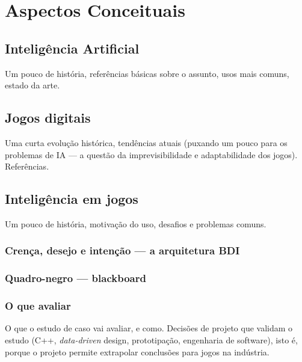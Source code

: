 \chapter{Aspectos Conceituais}

\section{Inteligência Artificial}

Um pouco de história, referências básicas sobre o assunto, usos mais
comuns, estado da arte.

\section{Jogos digitais}

Uma curta evolução histórica, tendências atuais (puxando um pouco para
os problemas de IA --- a questão da imprevisibilidade e adaptabilidade
dos jogos). Referências.

\section{Inteligência em jogos}

Um pouco de história, motivação do uso, desafios e problemas comuns.

\subsection{Crença, desejo e intenção --- a arquitetura BDI}

\subsection{Quadro-negro --- blackboard}

\subsection{O que avaliar}

O que o estudo de caso vai avaliar, e como. Decisões de projeto que
validam o estudo (C++, \emph{data-driven} design, prototipação,
engenharia de software), isto é, porque o projeto permite extrapolar
conclusões para jogos na indústria.
